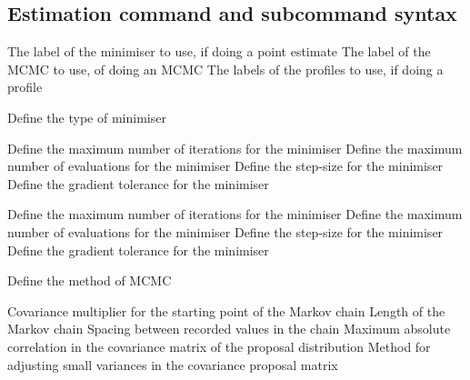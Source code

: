 \subsection{Estimation command and subcommand syntax}\par
{}\par\par
{} {The label of the minimiser to use, if doing a point estimate}
 {The label of the MCMC to use, of doing an MCMC}
 {The labels of the profiles to use, if doing a profile}
\par{}\par\par
{} {Define the type of minimiser}
\par\textbf{}\par
{} {Define the maximum number of iterations for the minimiser}
 {Define the maximum number of evaluations for the minimiser}
 {Define the step-size for the minimiser}
 {Define the gradient tolerance for the minimiser}
\par\textbf{}\par
{} {Define the maximum number of iterations for the minimiser}
 {Define the maximum number of evaluations for the minimiser}
 {Define the step-size for the minimiser}
 {Define the gradient tolerance for the minimiser}
\par{}\par\par
{} {Define the method of MCMC}
\par\textbf{}\par
{} {Covariance multiplier for the starting point of the Markov chain}
 {Length of the Markov chain}
 {Spacing between recorded values in the chain}
 {Maximum absolute correlation in the covariance matrix of the proposal distribution}
 {Method for adjusting small variances in the covariance proposal matrix}

